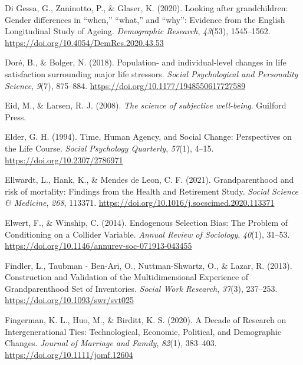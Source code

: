 \documentclass[
  english,
  man,floatsintext]{apa7}
\begin{document}
\leavevmode\hypertarget{ref-digessaLookingGrandchildrenGender2020}{}%
Di Gessa, G., Zaninotto, P., \& Glaser, K. (2020). Looking after grandchildren: Gender differences in ``when,'' ``what,'' and ``why'': Evidence from the English Longitudinal Study of Ageing. \emph{Demographic Research}, \emph{43}(53), 1545--1562. \url{https://doi.org/10.4054/DemRes.2020.43.53}

\leavevmode\hypertarget{ref-dorePopulationIndividuallevelChanges2018}{}%
Doré, B., \& Bolger, N. (2018). Population- and individual-level changes in life satisfaction surrounding major life stressors. \emph{Social Psychological and Personality Science}, \emph{9}(7), 875--884. \url{https://doi.org/10.1177/1948550617727589}

\leavevmode\hypertarget{ref-eidScienceSubjectiveWellbeing2008}{}%
Eid, M., \& Larsen, R. J. (2008). \emph{The science of subjective well-being}. Guilford Press.

\leavevmode\hypertarget{ref-elderTimeHumanAgency1994}{}%
Elder, G. H. (1994). Time, Human Agency, and Social Change: Perspectives on the Life Course. \emph{Social Psychology Quarterly}, \emph{57}(1), 4--15. \url{https://doi.org/10.2307/2786971}

\leavevmode\hypertarget{ref-ellwardtGrandparenthoodRiskMortality2021}{}%
Ellwardt, L., Hank, K., \& Mendes de Leon, C. F. (2021). Grandparenthood and risk of mortality: Findings from the Health and Retirement Study. \emph{Social Science \& Medicine}, \emph{268}, 113371. \url{https://doi.org/10.1016/j.socscimed.2020.113371}

\leavevmode\hypertarget{ref-elwertEndogenousSelectionBias2014}{}%
Elwert, F., \& Winship, C. (2014). Endogenous Selection Bias: The Problem of Conditioning on a Collider Variable. \emph{Annual Review of Sociology}, \emph{40}(1), 31--53. \url{https://doi.org/10.1146/annurev-soc-071913-043455}

\leavevmode\hypertarget{ref-findlerConstructionValidationMultidimensional2013}{}%
Findler, L., Taubman - Ben-Ari, O., Nuttman-Shwartz, O., \& Lazar, R. (2013). Construction and Validation of the Multidimensional Experience of Grandparenthood Set of Inventories. \emph{Social Work Research}, \emph{37}(3), 237--253. \url{https://doi.org/10.1093/swr/svt025}

\leavevmode\hypertarget{ref-fingermanDecadeResearchIntergenerational2020}{}%
Fingerman, K. L., Huo, M., \& Birditt, K. S. (2020). A Decade of Research on Intergenerational Ties: Technological, Economic, Political, and Demographic Changes. \emph{Journal of Marriage and Family}, \emph{82}(1), 383--403. \url{https://doi.org/10.1111/jomf.12604}
\end{document}
